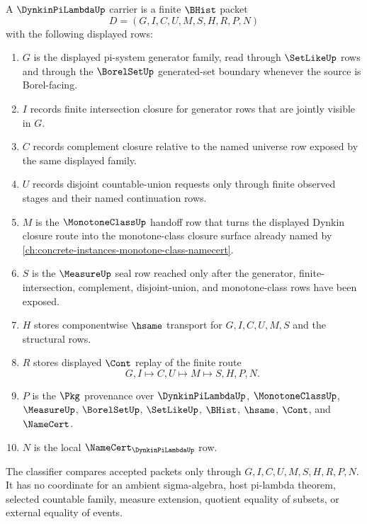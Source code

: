 \begin{definition}
\label{def:dynkin-pi-lambda-carrier}
A $\DynkinPiLambdaUp$ carrier is a finite $\BHist$ packet
$$
D=(G,I,C,U,M,S,H,R,P,N)
$$
with the following displayed rows:
\begin{enumerate}
\item $G$ is the displayed pi-system generator family, read through $\SetLikeUp$ rows and through the $\BorelSetUp$ generated-set boundary whenever the source is Borel-facing.
\item $I$ records finite intersection closure for generator rows that are jointly visible in $G$.
\item $C$ records complement closure relative to the named universe row exposed by the same displayed family.
\item $U$ records disjoint countable-union requests only through finite observed stages and their named continuation rows.
\item $M$ is the $\MonotoneClassUp$ handoff row that turns the displayed Dynkin closure route into the monotone-class closure surface already named by \autoref{ch:concrete-instances-monotone-class-namecert}.
\item $S$ is the $\MeasureUp$ seal row reached only after the generator, finite-intersection, complement, disjoint-union, and monotone-class rows have been exposed.
\item $H$ stores componentwise $\hsame$ transport for $G,I,C,U,M,S$ and the structural rows.
\item $R$ stores displayed $\Cont$ replay of the finite route
$$
G,I \longmapsto C,U \longmapsto M \longmapsto S,H,P,N .
$$
\item $P$ is the $\Pkg$ provenance over $\DynkinPiLambdaUp$, $\MonotoneClassUp$, $\MeasureUp$, $\BorelSetUp$, $\SetLikeUp$, $\BHist$, $\hsame$, $\Cont$, and $\NameCert$.
\item $N$ is the local $\NameCert_{\DynkinPiLambdaUp}$ row.
\end{enumerate}
The classifier compares accepted packets only through $G,I,C,U,M,S,H,R,P,N$. It has no coordinate for an ambient sigma-algebra, host pi-lambda theorem, selected countable family, measure extension, quotient equality of subsets, or external equality of events.
\end{definition}

